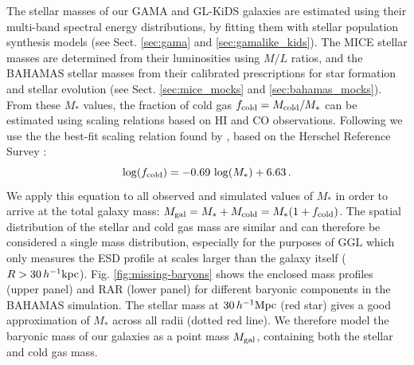 \documentclass[usenatbib]{mnras}
\newcommand{\hkpc}{\, h^{-1}{\rm{kpc}} }
\newcommand{\hMpc}{\, h^{-1}{\rm{Mpc}} }
\newcommand{\un}[1]{_{\rm #1}}
\begin{document}
The stellar masses of our GAMA and GL-KiDS galaxies are estimated using their multi-band spectral energy distributions, by fitting them with stellar population synthesis models (see Sect. \ref{sec:gama} and \ref{sec:gamalike_kids}). The MICE stellar masses are determined from their luminosities using $M/L$ ratios, and the BAHAMAS stellar masses from their calibrated prescriptions for star formation and stellar evolution (see Sect. \ref{sec:mice_mocks} and \ref{sec:bahamas_mocks}). From these $M_*$ values, the fraction of cold gas $f\un{cold} = M\un{cold}/M_*$ can be estimated using scaling relations based on HI and CO observations. Following \cite{brouwer2016} we use the the best-fit scaling relation found by \cite{boselli2014}, based on the  Herschel Reference Survey \cite[]{boselli2010}:
\begin{equation}\label{eq:fcold}
	\log(f\un{cold}) = -0.69 \, \log(M_*) + 6.63 \, .
\end{equation}
We apply this equation to all observed and simulated values of $M_*$ in order to arrive at the total galaxy mass: $M\un{gal} = M_* + M\un{cold} = M_* (1 + f\un{cold})$. The spatial distribution of the stellar and cold gas mass are similar \cite[]{pohlen2010,crocker2011,cooper2012,davis2013} and can therefore be considered a single mass distribution, especially for the purposes of GGL which only measures the ESD profile at scales larger than the galaxy itself ($R>30\hkpc$). Fig. \ref{fig:missing-baryons} shows the enclosed mass profiles (upper panel) and RAR (lower panel) for different baryonic components in the BAHAMAS simulation. The stellar mass at $30 \hMpc$ (red star) gives a good approximation of $M_*$ across all radii (dotted red line). We therefore model the baryonic mass of our galaxies as a point mass $M\un{gal}$, containing both the stellar and cold gas mass.
\end{document}
